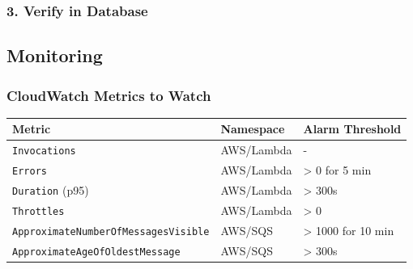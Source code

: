 \hypertarget{verify-in-database}{%
\subsubsection{3. Verify in Database}}

\begin{Shaded}
\begin{Highlighting}[]
\OperatorTok{=}\VariableTok{$(}\VariableTok{)}
   
\end{Highlighting}
\end{Shaded}

\hypertarget{monitoring}{%
\subsection{Monitoring}}

\hypertarget{cloudwatch-metrics-to-watch}{%
\subsubsection{CloudWatch Metrics to
Watch}}

\begingroup
\small
\setlength{\tabcolsep}{3pt}
\renewcommand{\arraystretch}{1.15}
\begin{longtable}[]{@{}lll@{}}
\toprule\noalign{}
Metric & Namespace & Alarm Threshold \\
\midrule\noalign{}
\endhead
\bottomrule\noalign{}
\endlastfoot
\texttt{Invocations} & AWS/Lambda & - \\
\texttt{Errors} & AWS/Lambda & \textgreater{} 0 for 5 min \\
\texttt{Duration} (p95) & AWS/Lambda & \textgreater{} 300s \\
\texttt{Throttles} & AWS/Lambda & \textgreater{} 0 \\
\texttt{ApproximateNumberOfMessagesVisible} & AWS/SQS & \textgreater{}
1000 for 10 min \\
\texttt{ApproximateAgeOfOldestMessage} & AWS/SQS & \textgreater{}
300s \\
\end{longtable}
\endgroup

